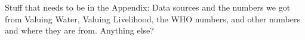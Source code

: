 Stuff that needs to be in the Appendix: 
Data sources and the numbers we got from Valuing Water, Valuing Livelihood, the WHO numbers, and other numbers and where they are from.
Anything else?